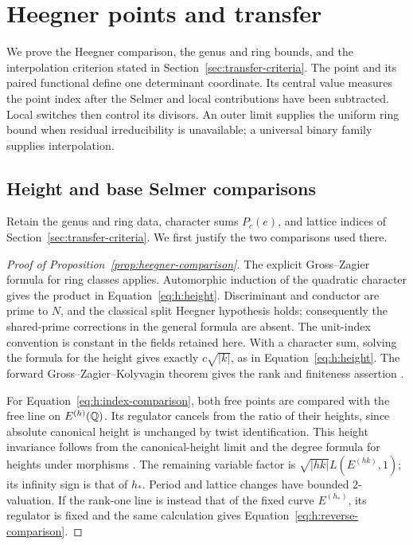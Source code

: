 \section{Heegner points and transfer}
\label{sec:heegner-interpolation}

We prove the Heegner comparison, the genus and ring bounds, and the
interpolation criterion stated in Section~\ref{sec:transfer-criteria}.
The point and its paired functional define one determinant coordinate.
Its central value measures the point index after the Selmer and local
contributions have been subtracted. Local switches then control its
divisors. An outer limit supplies the uniform ring bound when residual
irreducibility is unavailable; a universal binary family supplies
interpolation.

\subsection{Height and base Selmer comparisons}

Retain the genus and ring data, character sums $P_c(e)$, and lattice
indices of Section~\ref{sec:transfer-criteria}. We first justify the two
comparisons used there.

\begin{proof}[Proof of Proposition~\ref{prop:heegner-comparison}]
The explicit Gross--Zagier formula for ring classes
\citep[Theorem~1.1, pp.~2524--2525]{CaiShuTian2014} applies. Automorphic induction of the
quadratic character gives the product in Equation~\eqref{eq:h:height}. Discriminant and conductor are prime to $N$, and the
classical split Heegner hypothesis holds; consequently the shared-prime
corrections in the general formula are absent. The unit-index convention
is constant in the fields retained here. With a character sum, solving
the formula for the height gives exactly $c\sqrt{|k|}$, as in
Equation~\eqref{eq:h:height}. The forward Gross--Zagier--Kolyvagin theorem
gives the rank and finiteness assertion
\citep{GrossZagier1986,Kolyvagin1990}.

For Equation~\eqref{eq:h:index-comparison}, both free points are compared
with the free line on $E^{(h)}(\mathbb Q)$. Its regulator cancels from the ratio
of their heights, since absolute canonical height is unchanged by twist
identification. This height invariance follows from the canonical-height
limit and the degree formula for heights under morphisms
\citep[Chapter~IV, Lemmas~4.1 and~4.5--4.6, and Remark~4.12]{MilneEC2021}.
The remaining variable factor is
$\sqrt{|hk|}L(E^{(hk)},1)$; its infinity sign is that of $h_*$. Period
and lattice changes have bounded $2$-valuation. If the rank-one line is
instead that of the fixed curve $E^{(h_*)}$, its regulator is fixed and
the same calculation gives Equation~\eqref{eq:h:reverse-comparison}.
\end{proof}


